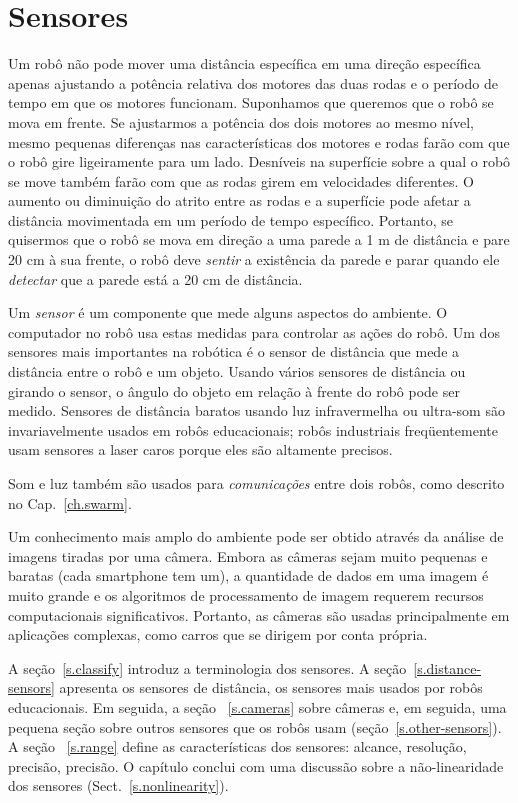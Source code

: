
\chapter{Sensores}\label{ch.sensors}

Um robô não pode mover uma distância específica em uma direção específica apenas ajustando a potência relativa dos motores das duas rodas e o período de tempo em que os motores funcionam. Suponhamos que queremos que o robô se mova em frente. Se ajustarmos a potência dos dois motores ao mesmo nível, mesmo pequenas diferenças nas características dos motores e rodas farão com que o robô gire ligeiramente para um lado. Desníveis na superfície sobre a qual o robô se move também farão com que as rodas girem em velocidades diferentes. O aumento ou diminuição do atrito entre as rodas e a superfície pode afetar a distância movimentada em um período de tempo específico. Portanto, se quisermos que o robô se mova em direção a uma parede a 1 m de distância e pare 20 cm à sua frente, o robô deve \emph{sentir} a existência da parede e parar quando ele \emph{detectar} que a parede está a 20 cm de distância.

Um \emph{sensor} é um componente que mede alguns aspectos do ambiente. O computador no robô usa estas medidas para controlar as ações do robô. Um dos sensores mais importantes na robótica é o sensor de distância que mede a distância entre o robô e um objeto. Usando vários sensores de distância ou girando o sensor, o ângulo do objeto em relação à frente do robô pode ser medido. Sensores de distância baratos usando luz infravermelha ou ultra-som são invariavelmente usados em robôs educacionais; robôs industriais freqüentemente usam sensores a laser caros porque eles são altamente precisos.

Som e luz também são usados para \emph{comunicações} entre dois robôs, como descrito no Cap.~\ref{ch.swarm}.

Um conhecimento mais amplo do ambiente pode ser obtido através da análise de imagens tiradas por uma câmera. Embora as câmeras sejam muito pequenas e baratas (cada smartphone tem um), a quantidade de dados em uma imagem é muito grande e os algoritmos de processamento de imagem requerem recursos computacionais significativos. Portanto, as câmeras são usadas principalmente em aplicações complexas, como carros que se dirigem por conta própria.

A seção~\ref{s.classify} introduz a terminologia dos sensores. A seção~\ref{s.distance-sensors} apresenta os sensores de distância, os sensores mais usados por robôs educacionais. Em seguida, a seção ~\ref{s.cameras} sobre câmeras e, em seguida, uma pequena seção sobre outros sensores que os robôs usam (seção~\ref{s.other-sensors}). A seção ~\ref{s.range} define as características dos sensores: alcance, resolução, precisão, precisão. O capítulo conclui com uma discussão sobre a não-linearidade dos sensores (Sect.~\ref{s.nonlinearity}).


